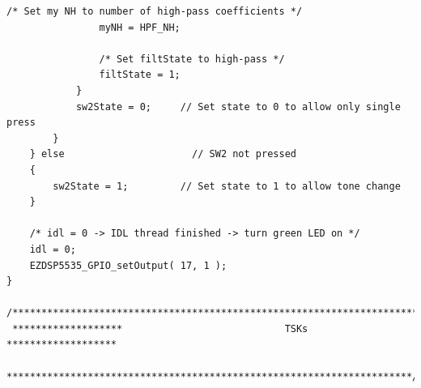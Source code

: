 \documentclass[11pt,pdftex,portrait,letterpaper]{article}
\begin{document}
\begin{lstlisting}[caption={audioProcessing.c}, label=l:programxx]
				/* Set my NH to number of high-pass coefficients */
				myNH = HPF_NH;

				/* Set filtState to high-pass */
				filtState = 1;
			}
			sw2State = 0;     // Set state to 0 to allow only single press
		}
	} else                      // SW2 not pressed
	{
		sw2State = 1;         // Set state to 1 to allow tone change
	}

	/* idl = 0 -> IDL thread finished -> turn green LED on */
	idl = 0;
    EZDSP5535_GPIO_setOutput( 17, 1 );
}

/**********************************************************************
 *******************                            TSKs                            *******************
 **********************************************************************/

\end{lstlisting}
\pagebreak
\end{document}
